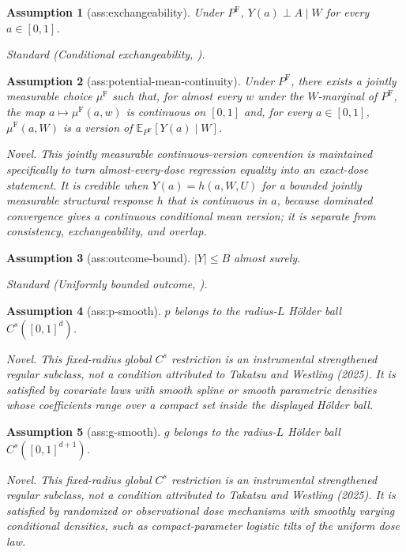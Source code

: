 \documentclass{article}
\newtheorem{assumption}{Assumption}
\begin{document}
\begin{assumption}[ass:exchangeability]\label{ass:exchangeability}
Under \(P^{\mathrm F}\), \(Y(a)\perp A\mid W\) for every \(a\in[0,1]\).
\par\smallskip\noindent\emph{Standard} (Conditional exchangeability, \cite{WestlingGilbertCarone2020}).
\end{assumption}

\begin{assumption}[ass:potential-mean-continuity]\label{ass:potential-mean-continuity}
Under \(P^{\mathrm F}\), there exists a jointly measurable choice \(\mu^{\mathrm F}\) such that, for almost every \(w\) under the \(W\)-marginal of \(P^{\mathrm F}\), the map \(a\mapsto\mu^{\mathrm F}(a,w)\) is continuous on \([0,1]\) and, for every \(a\in[0,1]\), \(\mu^{\mathrm F}(a,W)\) is a version of \(\mathbb E_{P^{\mathrm F}}[Y(a)\mid W]\).
\par\smallskip\noindent\emph{Novel.} This jointly measurable continuous-version convention is maintained specifically to turn almost-every-dose regression equality into an exact-dose statement. It is credible when \(Y(a)=h(a,W,U)\) for a bounded jointly measurable structural response \(h\) that is continuous in \(a\), because dominated convergence gives a continuous conditional mean version; it is separate from consistency, exchangeability, and overlap.
\end{assumption}

\begin{assumption}[ass:outcome-bound]\label{ass:outcome-bound}
\(|Y|\le B\) almost surely.
\par\smallskip\noindent\emph{Standard} (Uniformly bounded outcome, \cite{TakatsuWestling2025}).
\end{assumption}

\begin{assumption}[ass:p-smooth]\label{ass:p-smooth}
\(p\) belongs to the radius-\(L\) Hölder ball \(C^{s}([0,1]^d)\).
\par\smallskip\noindent\emph{Novel.} This fixed-radius global \(C^s\) restriction is an instrumental strengthened regular subclass, not a condition attributed to Takatsu and Westling (2025). It is satisfied by covariate laws with smooth spline or smooth parametric densities whose coefficients range over a compact set inside the displayed Hölder ball.
\end{assumption}

\begin{assumption}[ass:g-smooth]\label{ass:g-smooth}
\(g\) belongs to the radius-\(L\) Hölder ball \(C^{s}([0,1]^{d+1})\).
\par\smallskip\noindent\emph{Novel.} This fixed-radius global \(C^s\) restriction is an instrumental strengthened regular subclass, not a condition attributed to Takatsu and Westling (2025). It is satisfied by randomized or observational dose mechanisms with smoothly varying conditional densities, such as compact-parameter logistic tilts of the uniform dose law.
\end{assumption}
\end{document}
